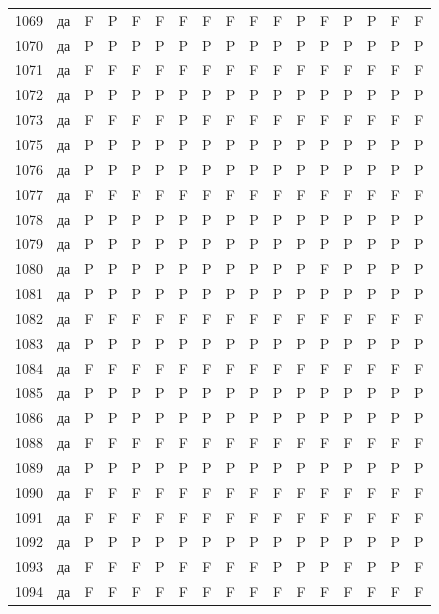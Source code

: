 \begin{table}[p]
\begin{tabular*}{\textwidth}{@{\extracolsep{\fill}}rcccccccccccccccc}
1069 & да & F & P & F & F & F & F & F & F & F & P & F & P & P & F & F\\
1070 & да & P & P & P & P & P & P & P & P & P & P & P & P & P & P & P\\
1071 & да & F & F & F & F & F & F & F & F & F & F & F & F & F & F & F\\
1072 & да & P & P & P & P & P & P & P & P & P & P & P & P & P & P & P\\
1073 & да & F & F & F & F & P & F & F & F & F & F & F & F & F & F & F\\
1075 & да & P & P & P & P & P & P & P & P & P & P & P & P & P & P & P\\
1076 & да & P & P & P & P & P & P & P & P & P & P & P & P & P & P & P\\
1077 & да & F & F & F & F & F & F & F & F & F & F & F & F & F & F & F\\
1078 & да & P & P & P & P & P & P & P & P & P & P & P & P & P & P & P\\
1079 & да & P & P & P & P & P & P & P & P & P & P & P & P & P & P & P\\
1080 & да & P & P & P & P & P & P & P & P & P & P & F & P & P & P & P\\
1081 & да & P & P & P & P & P & P & P & P & P & P & P & P & P & P & P\\
1082 & да & F & F & F & F & F & F & F & F & F & F & F & F & F & F & F\\
1083 & да & P & P & P & P & P & P & P & P & P & P & P & P & P & P & P\\
1084 & да & F & F & F & F & F & F & F & F & F & F & F & F & F & F & F\\
1085 & да & P & P & P & P & P & P & P & P & P & P & P & P & P & P & P\\
1086 & да & P & P & P & P & P & P & P & P & P & P & P & P & P & P & P\\
1088 & да & F & F & F & F & F & F & F & F & F & F & F & F & F & F & F\\
1089 & да & P & P & P & P & P & P & P & P & P & P & P & P & P & P & P\\
1090 & да & F & F & F & F & F & F & F & F & F & F & F & F & F & F & F\\
1091 & да & F & F & F & F & F & F & F & F & F & F & F & F & F & F & F\\
1092 & да & P & P & P & P & P & P & P & P & P & P & P & P & P & P & P\\
1093 & да & F & F & F & P & F & F & F & F & P & P & P & F & P & P & F\\
1094 & да & F & F & F & F & F & F & F & F & F & F & F & F & F & F & F\\
\bottomrule\end{tabular*}\end{table}
\clearpage

